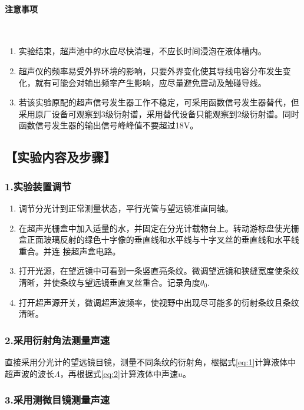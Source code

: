 \documentclass[12pt,a4paper,UTF8]{ctexart}
\begin{document}
    \paragraph{注意事项}~
    \newline
    \indent
    \begin{enumerate}[label=\arabic*.]
		\item 实验结束，超声池中的水应尽快清理，不应长时间浸泡在液体槽内。
		\item 超声仪的频率易受外界环境的影响，只要外界变化使其导线电容分布发生变化，就有可能会对输出频率产生影响，应尽量避免震动及触碰导线。
		\item 若该实验原配的超声信号发生器工作不稳定，可采用函数信号发生器替代，但采用原厂设备可观察到3级衍射谱，采用替代设备只能观察到2级衍射谱。同时函数信号发生器的输出信号峰峰值不要超过18V。
	\end{enumerate}


\subsection*{【实验内容及步骤】}

\subsubsection*{1.实验装置调节}
    \begin{enumerate}[label=\arabic*.]
		\item 调节分光计到正常测量状态，平行光管与望远镜准直同轴。
		\item 在超声光栅盒中加入适量的水，并固定在分光计载物台上。转动游标盘使光栅盒正面玻璃反射的绿色十字像的垂直线和水平线与十字叉丝的垂直线和水平线重合。并连
		接超声盒电路。
		\item 打开光源，在望远镜中可看到一条竖直亮条纹。微调望远镜和狭缝宽度使条纹清晰，并使条纹与望远镜垂直叉丝重合。记录角度$\theta_0$.
		\item 打开超声源开关，微调超声波频率，使视野中出现尽可能多的衍射条纹且条纹清晰。
	\end{enumerate}

\subsubsection*{2.采用衍射角法测量声速}

直接采用分光计的望远镜目镜，测量不同条纹的衍射角，根据式\ref{eq:1}计算液体中超声波的波长$\Lambda$，再根据式\ref{eq:2}计算液体中声速$u$。
\subsubsection*{3.采用测微目镜测量声速}
\end{document}
